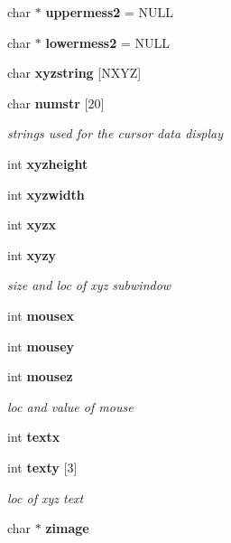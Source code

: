 \begin{CompactItemize}
\item 
char $\ast$ {\bf uppermess2} = NULL\label{xtvutils_8c_a130}

\item 
char $\ast$ {\bf lowermess2} = NULL\label{xtvutils_8c_a131}

\item 
char {\bf xyzstring} [NXYZ]\label{xtvutils_8c_a132}

\item 
char {\bf numstr} [20]\label{xtvutils_8c_a133}

\begin{CompactList}\small\item\em strings used for the cursor data display \item\end{CompactList}\item 
int {\bf xyzheight}\label{xtvutils_8c_a134}

\item 
int {\bf xyzwidth}\label{xtvutils_8c_a135}

\item 
int {\bf xyzx}\label{xtvutils_8c_a136}

\item 
int {\bf xyzy}\label{xtvutils_8c_a137}

\begin{CompactList}\small\item\em size and loc of xyz subwindow \item\end{CompactList}\item 
int {\bf mousex}\label{xtvutils_8c_a138}

\item 
int {\bf mousey}\label{xtvutils_8c_a139}

\item 
int {\bf mousez}\label{xtvutils_8c_a140}

\begin{CompactList}\small\item\em loc and value of mouse \item\end{CompactList}\item 
int {\bf textx}\label{xtvutils_8c_a141}

\item 
int {\bf texty} [3]\label{xtvutils_8c_a142}

\begin{CompactList}\small\item\em loc of xyz text \item\end{CompactList}\item 
char $\ast$ {\bf zimage}\label{xtvutils_8c_a143}


\end{CompactItemize}

